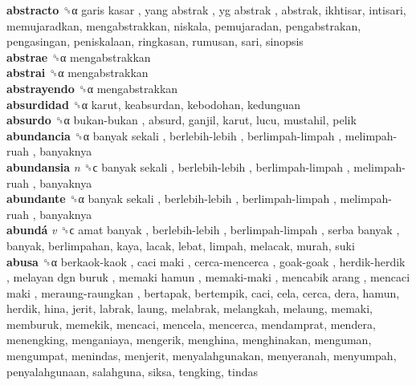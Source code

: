 \textbf{abstracto} ␝α   garis kasar ,  yang abstrak ,  yg abstrak , abstrak, ikhtisar, intisari, memujaradkan, mengabstrakkan, niskala, pemujaradan, pengabstrakan, pengasingan, peniskalaan, ringkasan, rumusan, sari, sinopsis  \\
\textbf{abstrae} ␝α  mengabstrakkan  \\
\textbf{abstrai} ␝α  mengabstrakkan  \\
\textbf{abstrayendo} ␝α  mengabstrakkan  \\
\textbf{absurdidad} ␝α  karut, keabsurdan, kebodohan, kedunguan  \\
\textbf{absurdo} ␝α   bukan-bukan , absurd, ganjil, karut, lucu, mustahil, pelik  \\
\textbf{abundancia} ␝α   banyak sekali ,  berlebih-lebih ,  berlimpah-limpah ,  melimpah-ruah , banyaknya  \\
\textbf{abundansia} \emph{n}  ␝ϲ   banyak sekali ,  berlebih-lebih ,  berlimpah-limpah ,  melimpah-ruah , banyaknya  \\
\textbf{abundante} ␝α   banyak sekali ,  berlebih-lebih ,  berlimpah-limpah ,  melimpah-ruah , banyaknya  \\
\textbf{abundá} \emph{v}  ␝ϲ   amat banyak ,  berlebih-lebih ,  berlimpah-limpah ,  serba banyak , banyak, berlimpahan, kaya, lacak, lebat, limpah, melacak, murah, suki  \\
\textbf{abusa} ␝α   berkaok-kaok ,  caci maki ,  cerca-mencerca ,  goak-goak ,  herdik-herdik ,  melayan dgn buruk ,  memaki hamun ,  memaki-maki ,  mencabik arang ,  mencaci maki ,  meraung-raungkan , bertapak, bertempik, caci, cela, cerca, dera, hamun, herdik, hina, jerit, labrak, laung, melabrak, melangkah, melaung, memaki, memburuk, memekik, mencaci, mencela, mencerca, mendamprat, mendera, menengking, menganiaya, mengerik, menghina, menghinakan, menguman, mengumpat, menindas, menjerit, menyalahgunakan, menyeranah, menyumpah, penyalahgunaan, salahguna, siksa, tengking, tindas  \\
